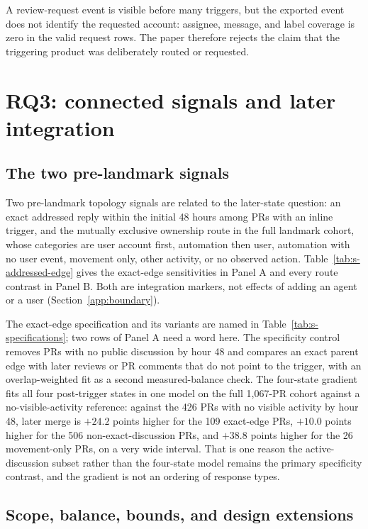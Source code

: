 \documentclass[pdflatex,sn-basic]{sn-jnl}
\begin{document}
A review-request event is visible before many triggers, but the exported event
does not identify the requested account: assignee, message, and label coverage
is zero in the valid request rows. The paper therefore rejects the claim that
the triggering product was deliberately routed or requested.



\section{RQ3: connected signals and later integration}\label{app:rq3}

\subsection{The two pre-landmark signals}\label{app:signals}

Two pre-landmark topology signals are related to the later-state question: an
exact addressed reply within the initial 48 hours among PRs with an inline
trigger, and the mutually exclusive ownership route in the full landmark cohort,
whose categories are user account first, automation then user, automation with
no user event, movement only, other activity, or no observed action.
Table~\ref{tab:s-addressed-edge} gives the exact-edge sensitivities in Panel A
and every route contrast in Panel B. Both are integration markers, not effects
of adding an agent or a user (Section~\ref{app:boundary}).

The exact-edge specification and its variants are named in
Table~\ref{tab:s-specifications}; two rows of Panel A need a word here. The
specificity control removes PRs with no public discussion by hour 48 and
compares an exact parent edge with later reviews or PR comments that do not
point to the trigger, with an overlap-weighted fit as a second measured-balance
check. The four-state gradient fits all four post-trigger states in one model on
the full 1,067-PR cohort against a no-visible-activity reference: against the
426 PRs with no visible activity by hour 48, later merge is $+24.2$ points
higher for the 109 exact-edge PRs, $+10.0$ points higher for the 506
non-exact-discussion PRs, and $+38.8$ points higher for the 26 movement-only
PRs, on a very wide interval. That is one reason the active-discussion subset
rather than the four-state model remains the primary specificity contrast, and
the gradient is not an ordering of response types.

\subsection{Scope, balance, bounds, and design extensions}\label{app:bounds}
\end{document}
